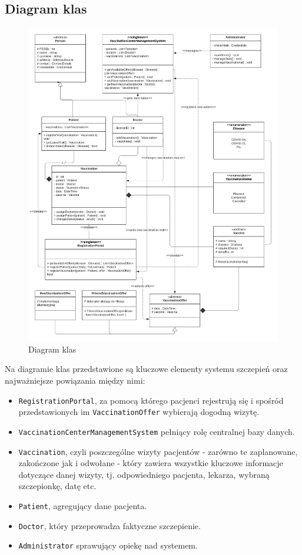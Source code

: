 \documentclass[a4paper,12pt,polish]{article}
\begin{document}
\subsection{Diagram klas}
\begin{figure}[p]
    \includegraphics[width=\textwidth]{IO1 - diagram klas rev 2.0 (1).pdf} 
    \caption{Diagram klas \label{fig:diagram-uml}}
\end{figure}

Na diagramie klas przedstawione są kluczowe elementy systemu szczepień oraz najważniejsze powiązania między nimi: 
\begin{itemize}
    \item \texttt{RegistrationPortal}, za pomocą którego pacjenci rejestrują się i spośród przedstawionych im \texttt{VaccinationOffer} wybierają dogodną wizytę.
    \item \texttt{VaccinationCenterManagementSystem} pełniący rolę centralnej bazy danych.
    \item \texttt{Vaccination}, czyli poszczególne wizyty pacjentów - zarówno te zaplanowane, zakończone jak i odwołane - który zawiera wszystkie kluczowe informacje dotyczące danej wizyty, tj. odpowiedniego pacjenta, lekarza, wybraną szczepionkę, datę etc.
    \item \texttt{Patient}, agregujący dane pacjenta.
    \item \texttt{Doctor}, który przeprowadza faktyczne szczepienie.
    \item \texttt{Administrator} sprawujący opiekę nad systemem.
\end{itemize}
\end{document}
